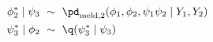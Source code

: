 \begin{align}
  \phi_{2}^{*} \mid \psi_{3} \,\, &\sim \,\, \pd_{\text{meld}, 2} (\phi_{1}, \phi_{2}, \psi_{1} \psi_{2} \mid Y_{1}, Y_{2}) \\
  \psi_{3}^{*} \mid \phi_{2} \,\, &\sim \,\, \q(\psi_{3}^{*} \mid \psi_{3})
  \label{eqn:stage-three-proposals}
\end{align}